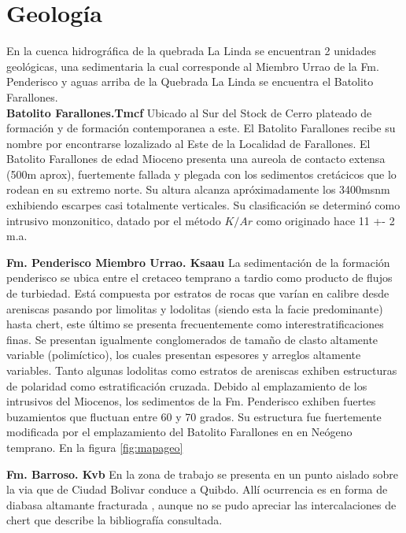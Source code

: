 \section{Geolog\'ia}
En la cuenca hidrogr\'afica de la quebrada La Linda se encuentran 2 unidades geol\'ogicas, una sedimentaria la cual corresponde al Miembro Urrao de la Fm. Penderisco y aguas arriba de la Quebrada La Linda se encuentra el Batolito Farallones.\\

\textbf{Batolito Farallones.Tmcf}
Ubicado al Sur del Stock de Cerro plateado de formaci\'on y de formaci\'on contemporanea a este. El Batolito Farallones recibe su nombre por encontrarse lozalizado al Este de la Localidad de Farallones.
El Batolito Farallones de edad Mioceno presenta una aureola de contacto extensa (500m aprox), fuertemente fallada y plegada con los sedimentos cret\'acicos que lo rodean en su extremo norte. Su altura alcanza apr\'oximadamente los 3400msnm exhibiendo escarpes casi totalmente verticales.
Su clasificaci\'on se determin\'o como intrusivo monzonitico, datado por el m\'etodo $K/Ar$ como originado hace 11 +- 2 m.a. \cite{farallones}
 

\textbf{Fm. Penderisco Miembro Urrao. Ksaau}
La sedimentaci\'on de la formaci\'on penderisco se ubica entre el cretaceo temprano a tardio como producto de flujos de turbiedad.
Est\'a compuesta por estratos de rocas que var\'ian en calibre desde areniscas pasando por limolitas y lodolitas (siendo esta la facie predominante) hasta chert, este \'ultimo se presenta frecuentemente como interestratificaciones finas. Se presentan igualmente conglomerados de tama\~no de clasto altamente variable (polim\'ictico), los cuales presentan espesores y arreglos altamente variables.
Tanto algunas lodolitas como estratos de areniscas exhiben estructuras de polaridad como estratificaci\'on cruzada.
Debido al emplazamiento de los intrusivos del Miocenos, los sedimentos de la Fm. Penderisco exhiben fuertes buzamientos que fluctuan  entre 60 y 70 grados. \cite{urrao}
Su estructura fue fuertemente modificada por el emplazamiento del Batolito Farallones en en Ne\'ogeno temprano. En la figura \ref{fig:mapageo}

\textbf{Fm. Barroso. Kvb}
En la zona de trabajo se presenta en un punto aislado sobre la via que de Ciudad Bolivar conduce a Quibdo.
All\'i ocurrencia es en forma de diabasa altamante fracturada \cite{barroso}, aunque no se pudo apreciar las intercalaciones de chert que describe la bibliograf\'ia consultada.

